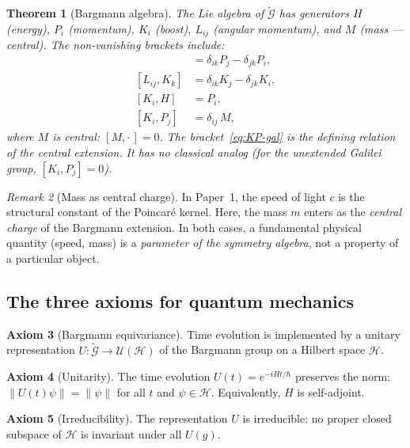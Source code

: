 \documentclass[12pt]{article}
\theoremstyle{plain}
\newtheorem{theorem}{Theorem}[section]
\theoremstyle{definition}
\newtheorem{axiom}[theorem]{Axiom}
\theoremstyle{remark}
\newtheorem{remark}[theorem]{Remark}
\begin{document}
\begin{theorem}[Bargmann algebra]\label{thm:bargmann-algebra}
The Lie algebra of $\widetilde{\mathcal{G}}$ has generators $H$ (energy), $P_i$ (momentum), $K_i$ (boost), $L_{ij}$ (angular momentum), and $M$ (mass --- central). The non-vanishing brackets include:
\begin{align}
[L_{ij}, P_k] &= \delta_{ik}P_j - \delta_{jk}P_i, \label{eq:LP-gal}\\
[L_{ij}, K_k] &= \delta_{ik}K_j - \delta_{jk}K_i, \label{eq:LK-gal}\\
[K_i, H] &= P_i, \label{eq:KH}\\
[K_i, P_j] &= \delta_{ij}\,M, \label{eq:KP-gal}
\end{align}
where $M$ is central: $[M, \cdot\,] = 0$. The bracket~\eqref{eq:KP-gal} is the defining relation of the central extension. It has no classical analog (for the unextended Galilei group, $[K_i, P_j] = 0$).
\end{theorem}

\begin{remark}[Mass as central charge]\label{rmk:mass-central}
In Paper~1, the speed of light $c$ is the structural constant of the Poincar\'e kernel. Here, the mass $m$ enters as the \emph{central charge} of the Bargmann extension. In both cases, a fundamental physical quantity (speed, mass) is a \emph{parameter of the symmetry algebra}, not a property of a particular object.
\end{remark}

\subsection{The three axioms for quantum mechanics}

\begin{axiom}[Bargmann equivariance]\label{ax:Q1}
Time evolution is implemented by a unitary representation $U: \widetilde{\mathcal{G}} \to \mathcal{U}(\mathcal{H})$ of the Bargmann group on a Hilbert space $\mathcal{H}$.
\end{axiom}

\begin{axiom}[Unitarity]\label{ax:Q2}
The time evolution $U(t) = e^{-iHt/\hbar}$ preserves the norm: $\|U(t)\psi\| = \|\psi\|$ for all $t$ and $\psi \in \mathcal{H}$. Equivalently, $H$ is self-adjoint.
\end{axiom}

\begin{axiom}[Irreducibility]\label{ax:Q3}
The representation $U$ is irreducible: no proper closed subspace of $\mathcal{H}$ is invariant under all $U(g)$.
\end{axiom}
\end{document}
